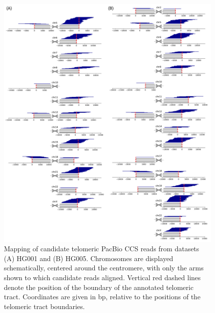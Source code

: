 \documentclass{article}
\begin{document}
\begin{figure}[ht!] \centering
\includegraphics[height=.65\textheight,width=\textwidth,keepaspectratio]{figures/HG00X-alignments.pdf}
\caption{
    Mapping of candidate telomeric PacBio CCS reads from datasets (A) HG001 and (B) HG005.
    Chromosomes are displayed schematically, centered around the centromere, with only the arms shown to which candidate reads aligned.
    Vertical red dashed lines denote the position of the boundary of the annotated telomeric tract.
    Coordinates are given in bp, relative to the positions of the telomeric tract boundaries.
}
\label{fig:hg00x_alignments}
\end{figure}
\clearpage \pagebreak
\end{document}
